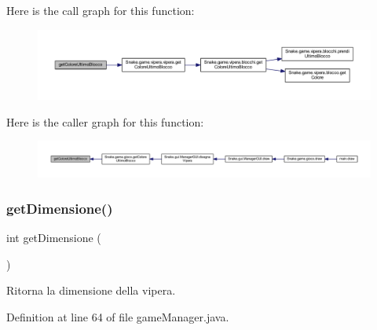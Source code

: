 Here is the call graph for this function\+:
\nopagebreak
\begin{figure}[H]
\begin{center}
\leavevmode
\includegraphics[width=350pt]{class_snake_1_1game_1_1utility_1_1game_manager_a1afbc9b85396f53e6180eab2e5a36d4d_cgraph}
\end{center}
\end{figure}
Here is the caller graph for this function\+:
\nopagebreak
\begin{figure}[H]
\begin{center}
\leavevmode
\includegraphics[width=350pt]{class_snake_1_1game_1_1utility_1_1game_manager_a1afbc9b85396f53e6180eab2e5a36d4d_icgraph}
\end{center}
\end{figure}
\mbox{\label{class_snake_1_1game_1_1utility_1_1game_manager_acda812adf1e0abdaf30cf3a2e2efaa07}} 
\subsubsection{\texorpdfstring{get\+Dimensione()}{getDimensione()}}
{\footnotesize\ttfamily int get\+Dimensione (\begin{DoxyParamCaption}{ }\end{DoxyParamCaption})}



Ritorna la dimensione della vipera. 



Definition at line 64 of file game\+Manager.\+java.

